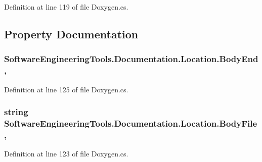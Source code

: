 Definition at line 119 of file Doxygen.\+cs.



\subsection{Property Documentation}
\hypertarget{class_software_engineering_tools_1_1_documentation_1_1_location_acc88f52f5a3c4baff9c28b50f93af935}{
\subsubsection[{Body\+End}]{ Software\+Engineering\+Tools.\+Documentation.\+Location.\+Body\+End\hspace{0.3cm}{\ttfamily [get]}, {\ttfamily [set]}}}\label{class_software_engineering_tools_1_1_documentation_1_1_location_acc88f52f5a3c4baff9c28b50f93af935}


Definition at line 125 of file Doxygen.\+cs.

\hypertarget{class_software_engineering_tools_1_1_documentation_1_1_location_a223e6ae79f810e6eebe94ecb9eb554ee}{
\subsubsection[{Body\+File}]{\setlength{\rightskip}{0pt plus 5cm}string Software\+Engineering\+Tools.\+Documentation.\+Location.\+Body\+File\hspace{0.3cm}{\ttfamily [get]}, {\ttfamily [set]}}}\label{class_software_engineering_tools_1_1_documentation_1_1_location_a223e6ae79f810e6eebe94ecb9eb554ee}


Definition at line 123 of file Doxygen.\+cs.

